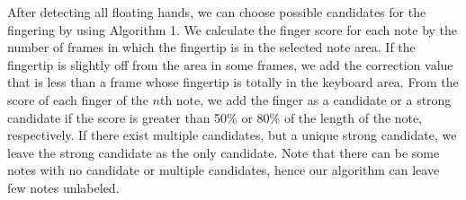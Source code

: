 \documentclass{article}
\begin{document}
After detecting all floating hands, we can choose possible candidates for the fingering by using Algorithm 1. We calculate the finger score for each note by the number of frames in which the fingertip is in the selected note area. If the fingertip is slightly off from the area in some frames, we add the correction value that is less than a frame whose fingertip is totally in the keyboard area. From the score of each finger of the $n$th note, we add the finger as a candidate or a strong candidate if the score is greater than 50\% or 80\% of the length of the note, respectively. If there exist multiple candidates, but a unique strong candidate, we leave the strong candidate as the only candidate. Note that there can be some notes with no candidate or multiple candidates, hence our algorithm can leave few notes unlabeled.
\end{document}
